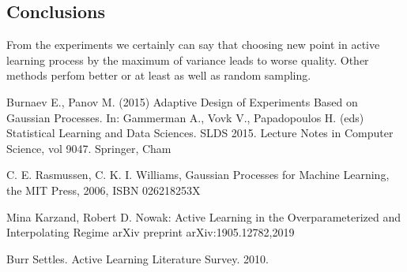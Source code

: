 \documentclass[a4paper]{article}
\begin{document}
\subsection{Conclusions}
From the experiments we certainly can say that choosing new point in active learning process by the maximum of variance leads to worse quality. Other methods perfom better or at least as well as random sampling.

\clearpage
\begin{thebibliography}{}

Burnaev E., Panov M. (2015) 
Adaptive Design of Experiments Based on Gaussian Processes. In: Gammerman A., Vovk V., Papadopoulos H. (eds) Statistical Learning and Data Sciences. SLDS 2015. 
Lecture Notes in Computer Science, vol 9047. Springer, Cham

C. E. Rasmussen, C. K. I. Williams, 
Gaussian Processes for Machine Learning, 
the MIT Press, 2006, ISBN 026218253X

Mina Karzand, Robert D. Nowak:
Active Learning in the Overparameterized
and Interpolating Regime
arXiv preprint arXiv:1905.12782,2019

Burr Settles. 
Active Learning Literature Survey.  
2010.

\end{thebibliography}
\end{document}
